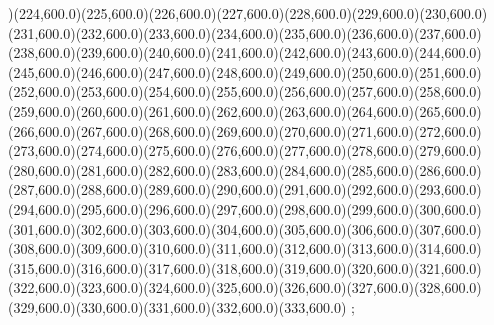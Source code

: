 {)(224,600.0)(225,600.0)(226,600.0)(227,600.0)(228,600.0)(229,600.0)(230,600.0)(231,600.0)(232,600.0)(233,600.0)(234,600.0)(235,600.0)(236,600.0)(237,600.0)(238,600.0)(239,600.0)(240,600.0)(241,600.0)(242,600.0)(243,600.0)(244,600.0)(245,600.0)(246,600.0)(247,600.0)(248,600.0)(249,600.0)(250,600.0)(251,600.0)(252,600.0)(253,600.0)(254,600.0)(255,600.0)(256,600.0)(257,600.0)(258,600.0)(259,600.0)(260,600.0)(261,600.0)(262,600.0)(263,600.0)(264,600.0)(265,600.0)(266,600.0)(267,600.0)(268,600.0)(269,600.0)(270,600.0)(271,600.0)(272,600.0)(273,600.0)(274,600.0)(275,600.0)(276,600.0)(277,600.0)(278,600.0)(279,600.0)(280,600.0)(281,600.0)(282,600.0)(283,600.0)(284,600.0)(285,600.0)(286,600.0)(287,600.0)(288,600.0)(289,600.0)(290,600.0)(291,600.0)(292,600.0)(293,600.0)(294,600.0)(295,600.0)(296,600.0)(297,600.0)(298,600.0)(299,600.0)(300,600.0)(301,600.0)(302,600.0)(303,600.0)(304,600.0)(305,600.0)(306,600.0)(307,600.0)(308,600.0)(309,600.0)(310,600.0)(311,600.0)(312,600.0)(313,600.0)(314,600.0)(315,600.0)(316,600.0)(317,600.0)(318,600.0)(319,600.0)(320,600.0)(321,600.0)(322,600.0)(323,600.0)(324,600.0)(325,600.0)(326,600.0)(327,600.0)(328,600.0)(329,600.0)(330,600.0)(331,600.0)(332,600.0)(333,600.0)
};
